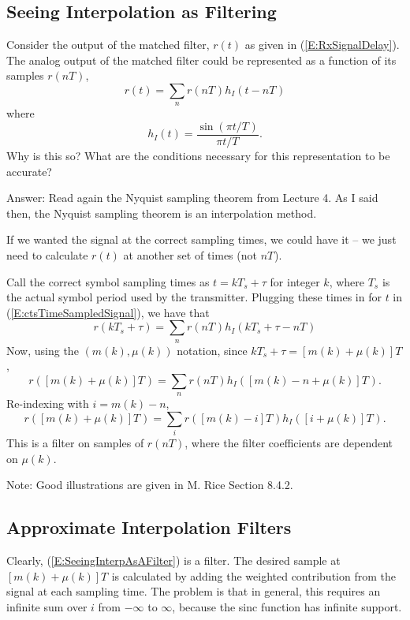 \subsection{Seeing Interpolation as Filtering}

Consider the output of the matched filter, $r(t)$ as given in
(\ref{E:RxSignalDelay}). The analog output of the matched filter
could be represented as a function of its samples $r(nT_{})$,
\begin{equation} \label{E:ctsTimeSampledSignal}
  r(t) = \sum_n r(nT_{}) h_I(t-nT_{})
\end{equation}
where
\[
  h_I(t) = \frac{\sin(\pi t/T_{})}{\pi t/T_{}}.
\]
Why is this so?  What are the conditions necessary for this
representation to be accurate?

Answer: Read again the Nyquist sampling theorem from Lecture 4.  As I said then, the Nyquist sampling theorem is an interpolation method.

If we wanted the signal at the correct sampling times, we could have
it -- we just need to calculate $r(t)$ at another set of times (not
$nT_{}$).

Call the correct symbol sampling times as $t = kT_{s} + \tau$ for
integer $k$, where $T_{s}$ is the actual symbol period used by the
transmitter. Plugging these times in for $t$ in
(\ref{E:ctsTimeSampledSignal}), we have that
\[
  r(kT_{s}+ \tau) = \sum_n r(nT_{}) h_I(kT_{s}+ \tau -nT_{})
\]
Now, using the $(m(k), \mu(k))$ notation, since $kT_{s} + \tau =
[m(k) + \mu(k)]T_{}$,
\[
  r([m(k) + \mu(k)]T_{}) = \sum_n r(nT_{}) h_I([m(k)-n +
  \mu(k)]T_{}).
\]
Re-indexing with $i=m(k) - n$,
\begin{equation} \label{E:SeeingInterpAsAFilter}
  r([m(k) + \mu(k)]T_{}) = \sum_i r([m(k)-i]T_{}) h_I([i +
  \mu(k)]T_{}).
\end{equation}
This is a filter on samples of $r(nT)$, where the filter
coefficients are dependent on $\mu(k)$.

Note:  Good illustrations are given in M. Rice Section 8.4.2.

\subsection{Approximate Interpolation Filters}

Clearly, (\ref{E:SeeingInterpAsAFilter}) is a filter.  The desired
sample at $[m(k) + \mu(k)]T_{}$ is calculated by adding the
weighted contribution from the signal at each sampling time.  The
problem is that in general, this requires an infinite sum over $i$
from $-\infty$ to $\infty$, because the sinc function has infinite
support.


